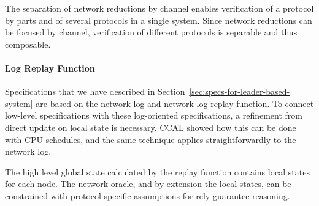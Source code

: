 The separation of network reductions by channel enables verification of a
protocol by parts and of several protocols in a single system. Since network
reductions can be focused by channel, verification of different protocols is
separable and thus composable.


\paragraph{Log Replay Function}
Specifications that we have described in
Section~\ref{sec:specs-for-leader-based-system} are based on the network log and network
log replay function. To connect low-level specifications with these log-oriented
specifications, a refinement from direct update on local state is necessary. 
 CCAL  showed how this can
be done with CPU schedules, and the same technique applies straightforwardly to
the network log.

The high level global state calculated by the replay function contains local
states for each node. The network oracle, and by extension the local states, can
be constrained with protocol-specific assumptions for rely-guarantee reasoning.
